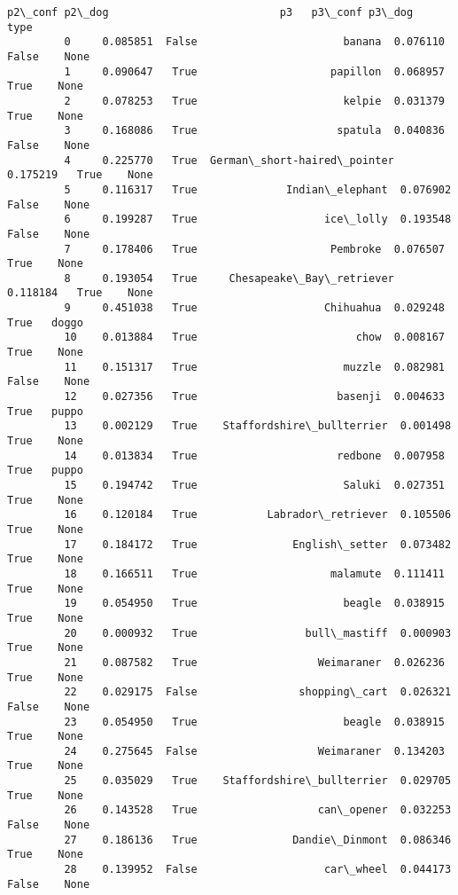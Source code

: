 \documentclass[11pt]{article}
\begin{document}
\begin{Verbatim}[commandchars=\\\{\}]
                p2\_conf p2\_dog                           p3   p3\_conf p3\_dog    type  
         0     0.085851  False                       banana  0.076110  False    None  
         1     0.090647   True                     papillon  0.068957   True    None  
         2     0.078253   True                       kelpie  0.031379   True    None  
         3     0.168086   True                      spatula  0.040836  False    None  
         4     0.225770   True  German\_short-haired\_pointer  0.175219   True    None  
         5     0.116317   True              Indian\_elephant  0.076902  False    None  
         6     0.199287   True                    ice\_lolly  0.193548  False    None  
         7     0.178406   True                     Pembroke  0.076507   True    None  
         8     0.193054   True     Chesapeake\_Bay\_retriever  0.118184   True    None  
         9     0.451038   True                    Chihuahua  0.029248   True   doggo  
         10    0.013884   True                         chow  0.008167   True    None  
         11    0.151317   True                       muzzle  0.082981  False    None  
         12    0.027356   True                      basenji  0.004633   True   puppo  
         13    0.002129   True    Staffordshire\_bullterrier  0.001498   True    None  
         14    0.013834   True                      redbone  0.007958   True   puppo  
         15    0.194742   True                       Saluki  0.027351   True    None  
         16    0.120184   True           Labrador\_retriever  0.105506   True    None  
         17    0.184172   True               English\_setter  0.073482   True    None  
         18    0.166511   True                     malamute  0.111411   True    None  
         19    0.054950   True                       beagle  0.038915   True    None  
         20    0.000932   True                 bull\_mastiff  0.000903   True    None  
         21    0.087582   True                   Weimaraner  0.026236   True    None  
         22    0.029175  False                shopping\_cart  0.026321  False    None  
         23    0.054950   True                       beagle  0.038915   True    None  
         24    0.275645  False                   Weimaraner  0.134203   True    None  
         25    0.035029   True    Staffordshire\_bullterrier  0.029705   True    None  
         26    0.143528   True                   can\_opener  0.032253  False    None  
         27    0.186136   True               Dandie\_Dinmont  0.086346   True    None  
         28    0.139952  False                    car\_wheel  0.044173  False    None  

\end{Verbatim}
\end{document}
